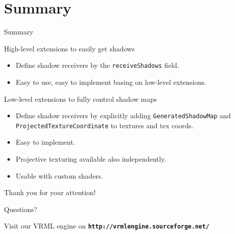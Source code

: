 \documentclass{beamer}
\begin{document}
\section{Summary}

\begin{frame}{Summary}

\begin{block}{High-level extensions to easily get shadows}
  \begin{itemize}
    \item Define shadow receivers by the \texttt{receiveShadows} field.
    \item Easy to use, easy to implement basing on low-level extensions.
  \end{itemize}
\end{block}

\begin{block}{Low-level extensions to fully control shadow maps}
  \begin{itemize}
    \item Define shadow receivers by explicitly adding
      \texttt{GeneratedShadowMap} and \texttt{ProjectedTextureCoordinate}
      to textures and tex coords.
    \item Easy to implement.
    \item Projective texturing available also independently.
    \item Usable with custom shaders.
  \end{itemize}
\end{block}


\end{frame}

\begin{frame}[t]

\begin{center}
{\Large Thank you for your attention!}
\end{center}

\vspace{0.25in}

\begin{center}
{\Huge \alert{Questions?}}
\end{center}

\vspace{0.25in}

\begin{center}
{\Large Visit our VRML engine on
{\color{blue} \textbf{\texttt{http://vrmlengine.sourceforge.net/}}}}
\end{center}
\end{frame}
\end{document}
